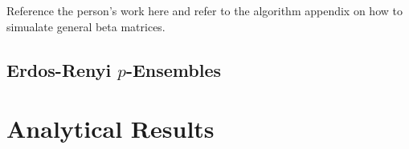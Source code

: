 Reference the person's work here and refer to the algorithm appendix on how to simualate general beta matrices.

\subsection{Erdos-Renyi $p$-Ensembles}

\section{Analytical Results}




